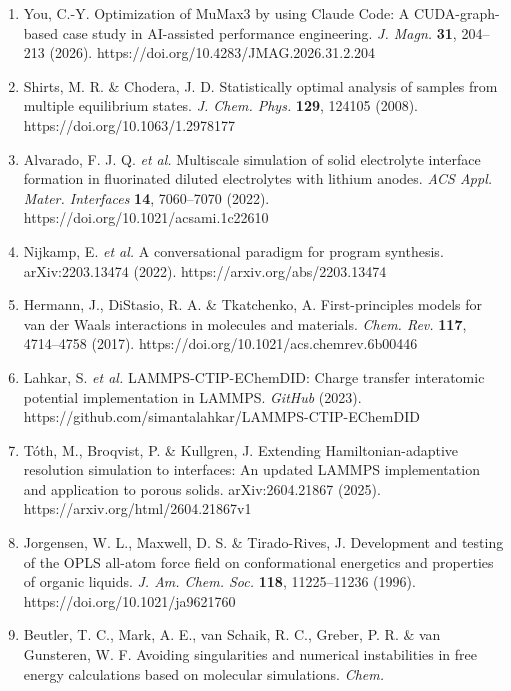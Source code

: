 \documentclass[
  11pt,
]{article}
\begin{document}
\begin{enumerate}
  Christ, C. D., Mark, A. E. \& van Gunsteren, W. F. Basic ingredients
  of free energy calculations: A review. \emph{J. Comput. Chem.}
  \textbf{31}, 1569--1582 (2010). https://doi.org/10.1002/jcc.21450
\item
  You, C.-Y. Optimization of MuMax3 by using Claude Code: A
  CUDA-graph-based case study in AI-assisted performance engineering.
  \emph{J. Magn.} \textbf{31}, 204--213 (2026).
  https://doi.org/10.4283/JMAG.2026.31.2.204
\item
  Shirts, M. R. \& Chodera, J. D. Statistically optimal analysis of
  samples from multiple equilibrium states. \emph{J. Chem. Phys.}
  \textbf{129}, 124105 (2008). https://doi.org/10.1063/1.2978177
\item
  Alvarado, F. J. Q. \emph{et al.} Multiscale simulation of solid
  electrolyte interface formation in fluorinated diluted electrolytes
  with lithium anodes. \emph{ACS Appl. Mater. Interfaces} \textbf{14},
  7060--7070 (2022). https://doi.org/10.1021/acsami.1c22610
\item
  Nijkamp, E. \emph{et al.} A conversational paradigm for program
  synthesis. arXiv:2203.13474 (2022). https://arxiv.org/abs/2203.13474
\item
  Hermann, J., DiStasio, R. A. \& Tkatchenko, A. First-principles models
  for van der Waals interactions in molecules and materials. \emph{Chem.
  Rev.} \textbf{117}, 4714--4758 (2017).
  https://doi.org/10.1021/acs.chemrev.6b00446
\item
  Lahkar, S. \emph{et al.} LAMMPS-CTIP-EChemDID: Charge transfer
  interatomic potential implementation in LAMMPS. \emph{GitHub} (2023).
  https://github.com/simantalahkar/LAMMPS-CTIP-EChemDID
\item
  Tóth, M., Broqvist, P. \& Kullgren, J. Extending Hamiltonian-adaptive
  resolution simulation to interfaces: An updated LAMMPS implementation
  and application to porous solids. arXiv:2604.21867 (2025).
  https://arxiv.org/html/2604.21867v1
\item
  Jorgensen, W. L., Maxwell, D. S. \& Tirado-Rives, J. Development and
  testing of the OPLS all-atom force field on conformational energetics
  and properties of organic liquids. \emph{J. Am. Chem. Soc.}
  \textbf{118}, 11225--11236 (1996). https://doi.org/10.1021/ja9621760
\item
  Beutler, T. C., Mark, A. E., van Schaik, R. C., Greber, P. R. \& van
  Gunsteren, W. F. Avoiding singularities and numerical instabilities in
  free energy calculations based on molecular simulations. \emph{Chem.
}
\end{enumerate}
\end{document}
